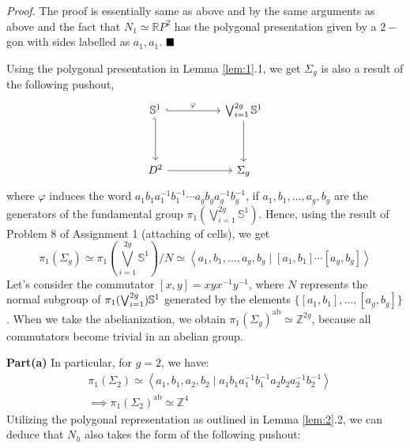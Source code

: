 \documentclass[11pt]{article}
\begin{document}
 \noindent \textit{Proof.}   The proof is essentially same as above and by the same arguments as above and the fact that \( N_1 \simeq \mathbb{R}P^2 \) has the polygonal presentation given by a \( 2- \)gon with sides labelled as \( a_1, a_1 \). $\hfill \blacksquare$




 \noindent Using the polygonal presentation in Lemma \ref{lem:1}.1, we get \( \Sigma_g \) is also a result of the following pushout, 
 \[\begin{tikzcd}
    \mathbb{S}^1 && \bigvee_{i=1}^{2g} \mathbb{S}^1 \\
    \\
    D^2 && {\Sigma_{g}}
    \arrow[hook, "\varphi", from=1-1, to=1-3]
    \arrow[hook', from=1-1, to=3-1]
    \arrow[from=3-1, to=3-3]
    \arrow[from=1-3, to=3-3]
  \end{tikzcd}\]
  where \( \varphi \) induces the word \( a_1b_1a_1^{-1}b_1^{-1} \cdots a_gb_ga_g^{-1}b_g^{-1} \), if \( a_1, b_1, \dots, a_g, b_g \) are the generators of the fundamental group \( \pi_1(\bigvee_{i=1}^{2g} \mathbb{S}^1) \). Hence, using the result of Problem 8 of Assignment 1 (attaching of cells), we get
  \[
    \pi_1(\Sigma_g) \simeq \pi_1\left(\bigvee_{i=1}^{2g} \mathbb{S}^1\right) \Bigg/ N \simeq \left\langle {a_1, b_1, \dots, a_g, b_g} \mid {[a_1,b_1]\cdots [a_g,b_g]} \right\rangle
  \]
Let's consider the commutator \([x, y] = xyx^{-1}y^{-1}\), where \(N\) represents the normal subgroup of \(\pi_1(\bigvee_{i=1}^{2g})\mathbb{S}^1\) generated by the elements \(\{[a_1, b_1], \ldots, [a_g, b_g]\}\). When we take the abelianization, we obtain \({\pi_1(\Sigma_g)}^{\text{ab}} \simeq \mathbb{Z}^{2g}\), because all commutators become trivial in an abelian group.
  
\noindent \textbf{Part(a)} In particular, for \(g = 2\), we have:
\begin{align*}
    &\pi_1(\Sigma_2) \simeq \left\langle {a_1, b_1, a_2, b_2} \mid {a_1b_1a_1^{-1}b_1^{-1}a_2b_2a_2^{-1}b_2^{-1}} \right\rangle\\
     &\implies {\pi_1(\Sigma_2)}^{\text{ab}} \simeq \mathbb{Z}^{4}
\end{align*}
Utilizing the polygonal representation as outlined in Lemma \ref{lem:2}.2, we can deduce that \( N_h \) also takes the form of the following pushout:
\end{document}
